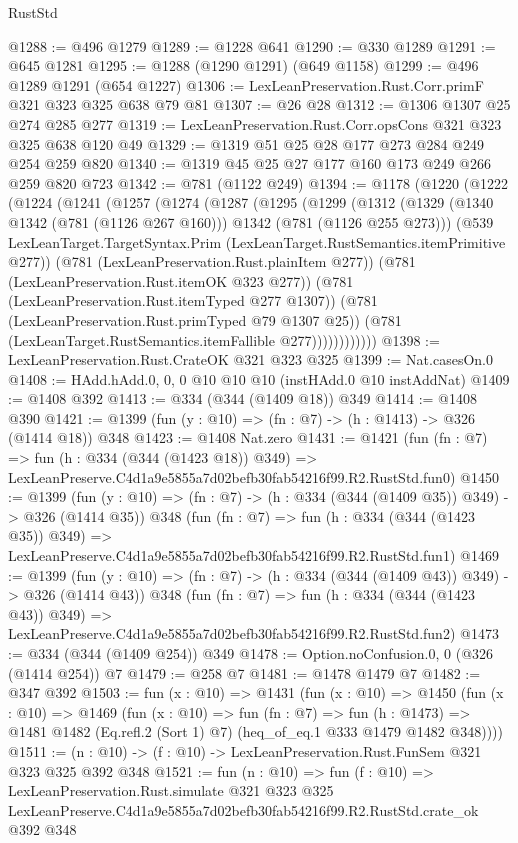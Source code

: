 \begin{lexlean}{RustStd}
\begin{coremodule}
@1288 := @496 @1279
@1289 := @1228 @641
@1290 := @330 @1289
@1291 := @645 @1281
@1295 := @1288 (@1290 @1291) (@649 @1158)
@1299 := @496 @1289 @1291 (@654 @1227)
@1306 := LexLeanPreservation.Rust.Corr.primF @321 @323 @325 @638 @79 @81
@1307 := @26 @28
@1312 := @1306 @1307 @25 @274 @285 @277
@1319 := LexLeanPreservation.Rust.Corr.opsCons @321 @323 @325 @638 @120 @49
@1329 := @1319 @51 @25 @28 @177 @273 @284 @249 @254 @259 @820
@1340 := @1319 @45 @25 @27 @177 @160 @173 @249 @266 @259 @820 @723
@1342 := @781 (@1122 @249)
@1394 := @1178
    (@1220
      (@1222
        (@1224
          (@1241
            (@1257
              (@1274
                (@1287
                  (@1295
                    (@1299
                      (@1312
                        (@1329
                          (@1340 @1342 (@781 (@1126 @267 @160)))
                          @1342
                          (@781 (@1126 @255 @273)))
                        (@539
                          LexLeanTarget.TargetSyntax.Prim
                          (LexLeanTarget.RustSemantics.itemPrimitive @277))
                        (@781 (LexLeanPreservation.Rust.plainItem @277))
                        (@781 (LexLeanPreservation.Rust.itemOK @323 @277))
                        (@781 (LexLeanPreservation.Rust.itemTyped @277 @1307))
                        (@781 (LexLeanPreservation.Rust.primTyped @79 @1307 @25))
                        (@781 (LexLeanTarget.RustSemantics.itemFallible @277))))))))))))
@1398 := LexLeanPreservation.Rust.CrateOK @321 @323 @325
@1399 := Nat.casesOn.{0}
@1408 := HAdd.hAdd.{0, 0, 0} @10 @10 @10 (instHAdd.{0} @10 instAddNat)
@1409 := @1408 @392
@1413 := @334 (@344 (@1409 @18)) @349
@1414 := @1408 @390
@1421 := @1399 (fun (y : @10) => (fn : @7) -> (h : @1413) -> @326 (@1414 @18)) @348
@1423 := @1408 Nat.zero
@1431 := @1421
    (fun (fn : @7) =>
    fun (h : @334 (@344 (@1423 @18)) @349) =>
    LexLeanPreserve.C4d1a9e5855a7d02befb30fab54216f99.R2.RustStd.fun0)
@1450 := @1399
    (fun (y : @10) => (fn : @7) -> (h : @334 (@344 (@1409 @35)) @349) -> @326 (@1414 @35))
    @348
    (fun (fn : @7) =>
    fun (h : @334 (@344 (@1423 @35)) @349) =>
    LexLeanPreserve.C4d1a9e5855a7d02befb30fab54216f99.R2.RustStd.fun1)
@1469 := @1399
    (fun (y : @10) => (fn : @7) -> (h : @334 (@344 (@1409 @43)) @349) -> @326 (@1414 @43))
    @348
    (fun (fn : @7) =>
    fun (h : @334 (@344 (@1423 @43)) @349) =>
    LexLeanPreserve.C4d1a9e5855a7d02befb30fab54216f99.R2.RustStd.fun2)
@1473 := @334 (@344 (@1409 @254)) @349
@1478 := Option.noConfusion.{0, 0} (@326 (@1414 @254)) @7
@1479 := @258 @7
@1481 := @1478 @1479 @7
@1482 := @347 @392
@1503 := fun (x : @10) =>
  @1431
    (fun (x : @10) =>
    @1450
      (fun (x : @10) =>
      @1469
        (fun (x : @10) =>
        fun (fn : @7) =>
        fun (h : @1473) =>
        @1481 @1482 (Eq.refl.{2} (Sort 1) @7) (heq_of_eq.{1} @333 @1479 @1482 @348))))
@1511 := (n : @10) -> (f : @10) -> LexLeanPreservation.Rust.FunSem @321 @323 @325 @392 @348
@1521 := fun (n : @10) =>
  fun (f : @10) =>
  LexLeanPreservation.Rust.simulate
    @321
    @323
    @325
    LexLeanPreserve.C4d1a9e5855a7d02befb30fab54216f99.R2.RustStd.crate_ok
    @392
    @348
\end{coremodule}
\end{lexlean}

